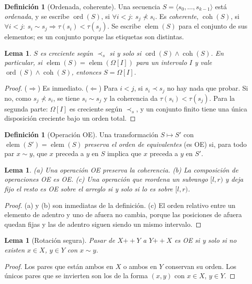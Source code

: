 \documentclass[10pt,a4paper]{article}
\theoremstyle{plain}
\newtheorem{lema}[teorema]{Lema}
\theoremstyle{definition}
\newtheorem{definicion}[teorema]{Definición}
\theoremstyle{remark}
\newcommand{\lt}{\prec}
\newcommand{\nlt}{\not\prec}
\newcommand{\eqv}{\sim}
\newcommand{\lts}{\prec_{s}}
\newcommand{\cat}{\mathbin{+\!\!+}}
\newcommand{\etq}{\tau}
\newcommand{\elems}{\operatorname{elem}}
\newcommand{\sortd}{\operatorname{ord}}
\newcommand{\coh}{\operatorname{coh}}
\begin{document}
\begin{definicion}[Ordenada, coherente]
Una secuencia $S=\langle s_0,\dots,s_{k-1}\rangle$ está \emph{ordenada}, y se escribe
$\sortd(S)$, si $\forall i<j:\ s_j\nlt s_i$. Es \emph{coherente}, $\coh(S)$, si
$\forall i<j:\ s_i\eqv s_j\Rightarrow\etq(s_i)<\etq(s_j)$. Se escribe $\elems(S)$
para el conjunto de sus elementos; es un conjunto porque las etiquetas son distintas.
\end{definicion}

\begin{lema}\label{lem:coh}
$S$ es creciente según $\lts$ si y solo si $\sortd(S)\wedge\coh(S)$. En particular,
si $\elems(S)=\elems(\Omega[I])$ para un intervalo $I$ y vale
$\sortd(S)\wedge\coh(S)$, entonces $S=\Omega[I]$.
\end{lema}
\begin{proof}
($\Rightarrow$) Es inmediato. ($\Leftarrow$) Para $i<j$, si $s_i\lt s_j$ no hay nada
que probar. Si no, como $s_j\nlt s_i$, se tiene $s_i\eqv s_j$ y la coherencia da
$\etq(s_i)<\etq(s_j)$. Para la segunda parte: $\Omega[I]$ es creciente según $\lts$,
y un conjunto finito tiene una única disposición creciente bajo un orden total.
\end{proof}

\begin{definicion}[Operación OE]
Una transformación $S\mapsto S'$ con $\elems(S')=\elems(S)$ \emph{preserva el orden
de equivalentes} (es OE) si, para todo par $x\eqv y$, que $x$ preceda a $y$ en $S$
implica que $x$ preceda a $y$ en $S'$.
\end{definicion}

\begin{lema}\label{lem:oe}
(a) Una operación OE preserva la coherencia. (b) La composición de operaciones OE es
OE. (c) Una operación que reordena un subrango $[l,r)$ y deja fijo el resto es OE
sobre el arreglo si y solo si lo es sobre $[l,r)$.
\end{lema}
\begin{proof}
(a) y (b) son inmediatas de la definición. (c) El orden relativo entre un elemento
de adentro y uno de afuera no cambia, porque las posiciones de afuera quedan fijas y
las de adentro siguen siendo un mismo intervalo.
\end{proof}

\begin{lema}[Rotación segura]\label{lem:rotsegura}
Pasar de $X\cat Y$ a $Y\cat X$ es OE si y solo si no existen $x\in X$, $y\in Y$ con
$x\eqv y$.
\end{lema}
\begin{proof}
Los pares que están ambos en $X$ o ambos en $Y$ conservan su orden. Los únicos pares
que se invierten son los de la forma $(x,y)$ con $x\in X$, $y\in Y$.
\end{proof}
\end{document}

